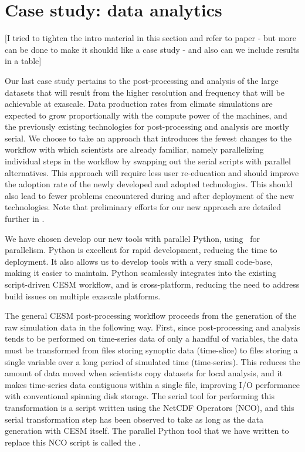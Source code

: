 \section{Case study: data analytics }\label{sec:postproc}

{\color{red} [I tried to tighten the intro material in this section and  refer to paper - but  more can be done to make it shouldd like a case study - and also can we include results in a table]}

Our last case study pertains to the post-processing and analysis of the large datasets that will result from 
the higher resolution and frequency that will be achievable at exascale.
Data production rates from climate simulations are expected to grow proportionally with the compute power of the machines, and the previously existing technologies for post-processing and analysis are mostly serial.  
We choose to take an approach that introduces the fewest changes to the workflow with which scientists are already familiar, namely parallelizing individual steps in the workflow by swapping out the serial scripts with parallel alternatives.  This approach will require less user re-education and should improve the adoption rate of the newly developed and adopted technologies.  This should also lead to fewer problems encountered during and after deployment of the new technologies. Note that preliminary efforts for our new approach are detailed further in \cite{paul2015}.

We have chosen develop our new tools with parallel Python, using \mpipy\ for parallelism.  Python is excellent for rapid development, reducing the time to deployment.  It also allows us to develop tools with a very small code-base, making it easier to maintain.  Python seamlessly integrates into the existing script-driven CESM workflow, and is cross-platform, reducing the need to address build issues on multiple exascale platforms.

The general CESM post-processing workflow proceeds from the generation of the raw simulation data in the following way.  First, since post-processing and analysis tends to be performed on time-series data of only a handful of variables, the data must be transformed from files storing synoptic data (time-slice) to files storing a single variable over a long period of simulated time (time-series).  This reduces the amount of data moved when scientists copy datasets for local analysis, and it makes time-series data contiguous within a single file, improving I/O performance with conventional spinning disk storage.  The serial tool for performing this transformation is a script written using the NetCDF Operators (NCO), and this serial transformation step has been observed to take as long as the data generation with CESM itself.  The parallel Python tool that we have written to replace this NCO script is called the \pyreshaper.

